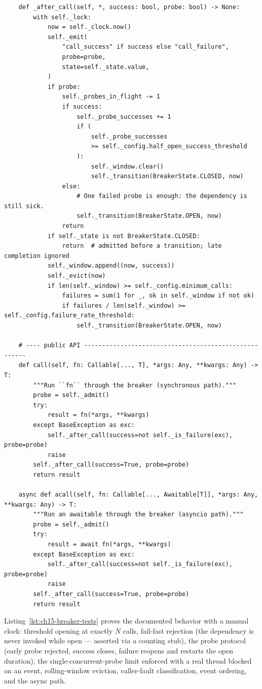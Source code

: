 \begin{verbatim}
    def _after_call(self, *, success: bool, probe: bool) -> None:
        with self._lock:
            now = self._clock.now()
            self._emit(
                "call_success" if success else "call_failure",
                probe=probe,
                state=self._state.value,
            )
            if probe:
                self._probes_in_flight -= 1
                if success:
                    self._probe_successes += 1
                    if (
                        self._probe_successes
                        >= self._config.half_open_success_threshold
                    ):
                        self._window.clear()
                        self._transition(BreakerState.CLOSED, now)
                else:
                    # One failed probe is enough: the dependency is still sick.
                    self._transition(BreakerState.OPEN, now)
                return
            if self._state is not BreakerState.CLOSED:
                return  # admitted before a transition; late completion ignored
            self._window.append((now, success))
            self._evict(now)
            if len(self._window) >= self._config.minimum_calls:
                failures = sum(1 for _, ok in self._window if not ok)
                if failures / len(self._window) >= self._config.failure_rate_threshold:
                    self._transition(BreakerState.OPEN, now)

    # ---- public API ------------------------------------------------------
    def call(self, fn: Callable[..., T], *args: Any, **kwargs: Any) -> T:
        """Run ``fn`` through the breaker (synchronous path)."""
        probe = self._admit()
        try:
            result = fn(*args, **kwargs)
        except BaseException as exc:
            self._after_call(success=not self._is_failure(exc), probe=probe)
            raise
        self._after_call(success=True, probe=probe)
        return result

    async def acall(self, fn: Callable[..., Awaitable[T]], *args: Any, **kwargs: Any) -> T:
        """Run an awaitable through the breaker (asyncio path)."""
        probe = self._admit()
        try:
            result = await fn(*args, **kwargs)
        except BaseException as exc:
            self._after_call(success=not self._is_failure(exc), probe=probe)
            raise
        self._after_call(success=True, probe=probe)
        return result
\end{verbatim}

Listing~\ref{lst:ch15-breaker-tests} proves the documented behavior with a
manual clock: threshold opening at exactly $N$ calls, fail-fast rejection
(the dependency is never invoked while open --- asserted via a counting
stub), the probe protocol (early probe rejected, success closes, failure
reopens and restarts the open duration), the single-concurrent-probe limit
enforced with a real thread blocked on an event, rolling-window eviction,
caller-fault classification, event ordering, and the async path.

